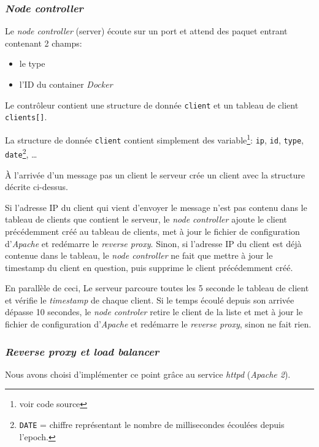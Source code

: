 \documentclass[a4paper,11pt,titlepage]{article}
\begin{document}
\subsubsection{\emph{Node controller}}
Le \emph{node controller} (server) écoute sur un port et attend des paquet entrant contenant 2 champs:

\begin{itemize}
	\item le type 
	\item l'ID du container \emph{Docker}
\end{itemize}

Le contrôleur contient une structure de donnée \texttt{client} et un tableau de client \texttt{clients[]}.

La structure de donnée \texttt{client} contient simplement des variable\footnote{voir code source}: \texttt{ip},
\texttt{id}, \texttt{type}, \texttt{date}\footnote{\texttt{DATE} = chiffre représentant le nombre de millisecondes
écoulées depuis l'epoch.}, \ldots

À l'arrivée d'un message pas un client le serveur crée un client avec la structure décrite ci-dessus.

Si l'adresse IP du client qui vient d'envoyer le message n'est pas contenu dans le tableau de clients que contient le serveur, 
le \emph{node controller} ajoute le client précédemment créé au tableau de clients, met à jour le fichier de configuration
d'\emph{Apache} et redémarre le \emph{reverse proxy}. Sinon, si l'adresse IP du client est déjà contenue dans le tableau, le
\emph{node controller} ne fait que mettre à jour le timestamp du client en question, puis supprime le client précédemment créé. 

En parallèle de ceci, Le serveur parcoure toutes les 5 seconde le tableau de client et vérifie le \emph{timestamp} de chaque
client. Si le temps écoulé depuis son arrivée dépasse 10 secondes, le \emph{node controler} retire le client de la liste et
met à jour le fichier de configuration d'\emph{Apache} et redémarre le \emph{reverse proxy}, sinon ne fait rien.

\subsubsection{\emph{Reverse proxy et load balancer}}
Nous avons choisi d'implémenter ce point grâce au service \emph{httpd} (\emph{Apache 2}).
\end{document}
